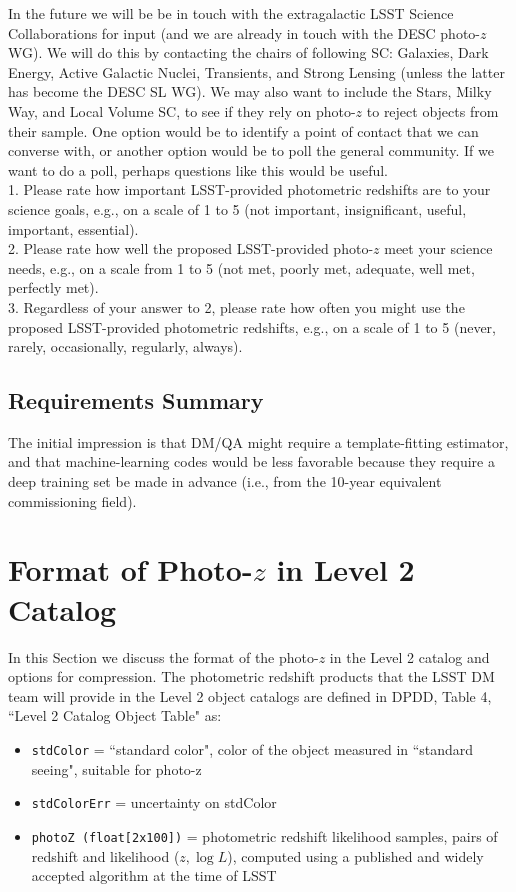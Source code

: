 \documentclass[DM,lsstdraft,toc]{lsstdoc}
\begin{document}
\smallskip
In the future we will be be in touch with the extragalactic LSST Science Collaborations for input (and we are already in touch with the DESC photo-$z$ WG). We will do this by contacting the chairs of following SC: Galaxies, Dark Energy, Active Galactic Nuclei, Transients, and Strong Lensing (unless the latter has become the DESC SL WG). We may also want to include the Stars, Milky Way, and Local Volume SC, to see if they rely on photo-$z$ to reject objects from their sample. One option would be to identify a point of contact that we can converse with, or another option would be to poll the general community. If we want to do a poll, perhaps questions like this would be useful. \\
1. Please rate how important LSST-provided photometric redshifts are to your science goals, e.g., on a scale of 1 to 5 (not important, insignificant, useful, important, essential). \\
2. Please rate how well the proposed LSST-provided photo-$z$ meet your science needs, e.g., on a scale from 1 to 5 (not met, poorly met, adequate, well met, perfectly met). \\
3. Regardless of your answer to 2, please rate how often you might use the proposed LSST-provided photometric redshifts, e.g., on a scale of 1 to 5 (never, rarely, occasionally, regularly, always).

\subsection{Requirements Summary}

The initial impression is that DM/QA might require a template-fitting estimator, and that machine-learning codes would be less favorable because they require a deep training set be made in advance (i.e., from the 10-year equivalent commissioning field). 


\section{Format of Photo-$z$ in Level 2 Catalog}\label{sec:format}

In this Section we discuss the format of the photo-$z$ in the Level 2 catalog and options for compression. The photometric redshift products that the LSST DM team will provide in the Level 2 object catalogs are defined in DPDD, Table 4, ``Level 2 Catalog Object Table" as:
\begin{itemize}
\item {\tt stdColor} = ``standard color", color of the object measured in ``standard seeing", suitable for photo-z
\item {\tt stdColorErr} = uncertainty on stdColor
\item {\tt photoZ (float[2x100])} = photometric redshift likelihood samples, pairs of redshift and likelihood ($z,\log{L}$), computed using a published and widely accepted algorithm at the time of LSST
\end{itemize}
\end{document}
